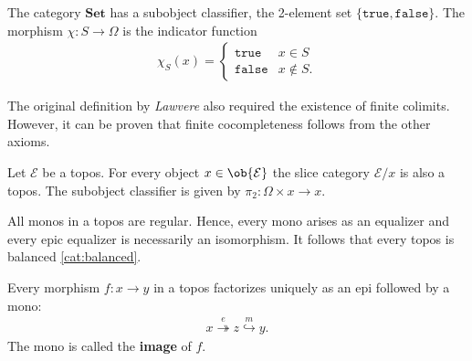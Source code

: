     \begin{example}
        The category $\mathbf{Set}$ has a subobject classifier, the 2-element set $\{\texttt{true},\texttt{false}\}$. The morphism $\chi:S\rightarrow\Omega$ is the indicator function
        \begin{gather}
            \chi_S(x)=
            \begin{cases}
                \texttt{true}&x\in S\\
                \texttt{false}&x\not\in S.
            \end{cases}
        \end{gather}
    \end{example}

    \begin{remark}
        The original definition by \textit{Lawvere} also required the existence of finite colimits. However, it can be proven that finite cocompleteness follows from the other axioms.
    \end{remark}

    \begin{theorem}
        Let $\mathcal{E}$ be a topos. For every object $x\in\ob{\mathcal{E}}$ the slice category $\mathcal{E}/x$ is also a topos. The subobject classifier is given by $\pi_2:\Omega\times x\rightarrow x$.
    \end{theorem}

    \begin{property}[Balanced]
        All monos in a topos are regular. Hence, every mono arises as an equalizer and every epic equalizer is necessarily an isomorphism. It follows that every topos is balanced \ref{cat:balanced}.
    \end{property}

    \begin{property}
        Every morphism $f:x\rightarrow y$ in a topos factorizes uniquely as an epi followed by a mono:
        \begin{gather}
            x\overset{e}{\twoheadrightarrow}z\overset{m}{\hookrightarrow}y.
        \end{gather}
        The mono is called the \textbf{image} of $f$.
    \end{property}

